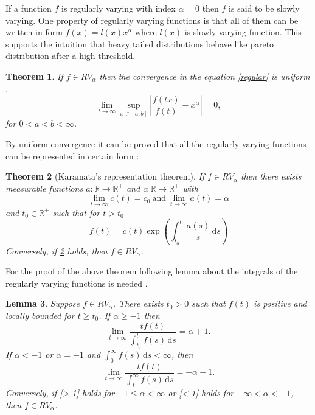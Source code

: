 \documentclass[english,12pt,a4paper,pdftex,sci,utf8]{aaltothesis} %
\newtheorem{theorem}{Theorem}[section]
\newtheorem{lemma}[theorem]{Lemma}
\begin{document}
If a function $f$  is regularly varying with index $\alpha=0$ then $f$ is said to be slowly varying. One property of regularly varying functions is that all of them can be written in form $f(x)=l(x)x^{\alpha}$ where $l(x)$ is slowly varying function. This supports the intuition that heavy tailed distributions behave like pareto distribution after a high threshold. 



\begin{theorem}
If $f \in RV_{\alpha}$ then the convergence in the equation \eqref{regular} is uniform .
\begin{equation*}
\lim_{t \rightarrow \infty} \sup_{x  \in [a,b]} \left| \frac{f(tx)}{f(t)} - x^{\alpha} \right| = 0,
\end{equation*}
for $0<a<b<\infty$.
\label{uniform}
\end{theorem}



By uniform convergence it can be proved that all the regularly varying functions can be represented in certain form \cite{deHaan}:

\begin{theorem}[Karamata's representation theorem]
If $f \in RV_{\alpha}$ then there exists measurable functions $a: \mathbb{R} \rightarrow \mathbb{R^+}$ and $c: \mathbb{R} \rightarrow \mathbb{R^+}$ with
\begin{equation*}
\lim_{t \rightarrow \infty} c(t) = c_0 \  \text{and} \  \lim_{t \rightarrow \infty} a(t) = \alpha
\end{equation*}
and $t_0 \in \mathbb{R^+}$ such that for $t > t_0$
\begin{equation}
f(t) = c(t) \exp \left(\int_{t_0}^{t}  \frac{a(s)}{s} \, \mathrm{d}s \right)
\end{equation}
Conversely, if \ref{karamata} holds, then $f \in RV_{\alpha}$.
\label{karamata}
\end{theorem}

For the proof of the above theorem following lemma about the integrals of the regularly varying functions is needed \cite{deHaan}.

\begin{lemma}
Suppose $f \in RV_{\alpha}$. There exists $t_0 > 0$ such that $f(t)$ is positive and locally bounded for $t \geq t_0$. If $\alpha \geq -1$ then
\begin{equation}
\lim_{t \rightarrow \infty} \frac{tf(t)}{\int_{t_0}^{t}f(s) \, \mathrm{d}s} = \alpha + 1.
\label{>-1}
\end{equation}
If $\alpha<-1$ or $\alpha= -1$ and $\int_{0}^{\infty}f(s) \, \mathrm{d}s<\infty$, then
\begin{equation}
\lim_{t \rightarrow \infty} \frac{tf(t)}{\int_{t}^{\infty} f(s) \, \mathrm{d}s} = -\alpha - 1.
\label{<-1}
\end{equation}
Conversely, if \eqref{>-1} holds for $-1\leq \alpha < \infty$ or \eqref{<-1} holds for $-\infty<\alpha<-1$, then $f \in RV_{\alpha}$.
\label{karamlemma}
\end{lemma}
\end{document}
